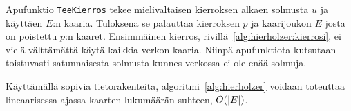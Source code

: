 Apufunktio \texttt{TeeKierros} tekee mielivaltaisen kierroksen alkaen solmusta $u$ ja käyttäen $E$:n kaaria. Tuloksena se palauttaa kierroksen $p$ ja kaarijoukon $E$ josta on poistettu $p$:n kaaret. Ensimmäinen kierros, rivillä~\ref{alg:hierholzer:kierrosi}, ei vielä välttämättä käytä kaikkia verkon kaaria. Niinpä apufunktiota kutsutaan toistuvasti satunnaisesta solmusta kunnes verkossa ei ole enää solmuja. 

Käyttämällä sopivia tietorakenteita, algoritmi~\ref{alg:hierholzer} voidaan toteuttaa lineaarisessa ajassa kaarten lukumäärän suhteen, $O(\lvert E\rvert)$.






